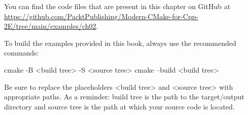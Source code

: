 You can find the code files that are present in this chapter on GitHub at \url{https://github.com/PacktPublishing/Modern-CMake-for-Cpp-2E/tree/main/examples/ch02}.

To build the examples provided in this book, always use the recommended commands:

\begin{shell}
cmake -B <build tree> -S <source tree>
cmake --build <build tree>
\end{shell}

Be sure to replace the placeholders <build tree> and <source tree> with appropriate paths. As a reminder: build tree is the path to the target/output directory and source tree is the path at which your source code is located.













